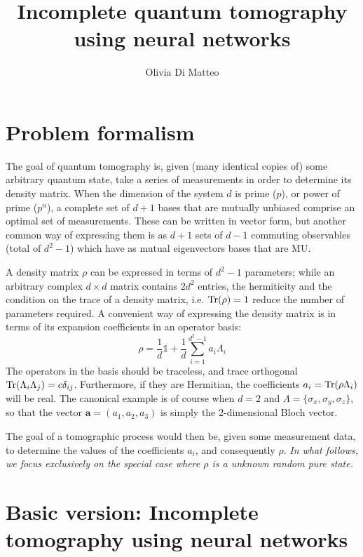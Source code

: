 \documentclass[a4paper,10pt]{article}
\title{Incomplete quantum tomography using neural networks}
\author{Olivia Di Matteo}
\begin{document}
\maketitle

\section{Problem formalism}

The goal of quantum tomography is, given (many identical copies of) some arbitrary quantum state, take a series of measurements in order to determine its density matrix. When the dimension of the system $d$ is prime ($p$), or power of prime ($p^n$), a complete set of $d + 1$ bases that are mutually unbiased comprise an optimal set of measurements. These can be written in vector form, but another common way of expressing them is as $d + 1$ sets of $d - 1$ commuting observables (total of $d^2-1$) which have as mutual eigenvectors bases that are MU.

A density matrix $\rho$ can be expressed in terms of $d^2 - 1$ parameters; while an arbitrary complex $d \times d$ matrix contains $2d^2$ entries, the hermiticity and the condition on the trace of a density matrix, i.e. $\hbox{Tr}(\rho) = 1$ reduce the number of parameters required. A convenient way of expressing the density matrix is in terms of its expansion coefficients in an operator basis:
\begin{equation}
 \rho = \frac{1}{d} \mathds{1} + \frac{1}{d} \sum_{i = 1}^{d^2 - 1} a_i \Lambda_i 
\end{equation}
\noindent The operators in the basis should be traceless, and trace orthogonal $\hbox{Tr}(\Lambda_i \Lambda_j) = c \delta_{ij}$. Furthermore, if they are Hermitian, the  coefficients $a_i = \hbox{Tr}( \rho \Lambda_i )$ will be real. The canonical example is of course when $d = 2$ and $\Lambda = \{ \sigma_x, \sigma_y, \sigma_z \}$, so that the vector $\mathbf{a} = (a_1, a_2, a_3)$ is simply the 2-dimensional Bloch vector. 

The goal of a tomographic process would then be, given some measurement data, to determine the values of the coefficients $a_i$, and consequently $\rho$. \emph{In what follows, we focus exclusively on the special case where $\rho$ is a unknown random pure state.}

\section{Basic version: Incomplete tomography using neural networks}
\end{document}
